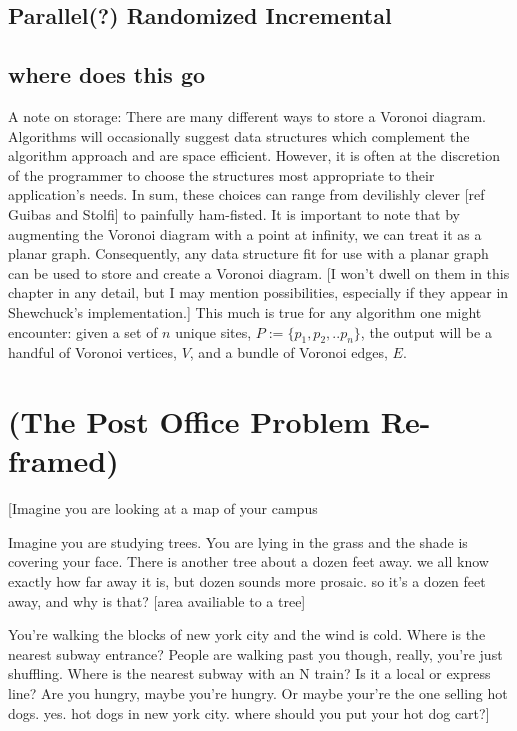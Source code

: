 \documentclass[12pt,twoside]{reedthesis}
\begin{document}
  \section{Parallel(?) Randomized Incremental} %
  \label{sec:parallel_randomized_incremental}

  \section{where does this go}
    A note on storage: There are many different ways to store a Voronoi diagram. Algorithms will occasionally suggest data structures which complement the algorithm approach and are space efficient. However, it is often at the discretion of the programmer to choose the structures most appropriate to their application's needs. In sum, these choices can range from devilishly clever [ref Guibas and Stolfi] to painfully ham-fisted. It is important to note that by augmenting the Voronoi diagram with a point at infinity, we can treat it as a planar graph. Consequently, any data structure fit for use with a planar graph can be used to store and create a Voronoi diagram. [I won't dwell on them in this chapter in any detail, but I may mention possibilities, especially if they appear in Shewchuck's implementation.] This much is true for any algorithm one might encounter: given a set of $n$ unique sites, $P:=\{p_{1}, p_{2}, .. p_{n}\}$, the output will be a handful of Voronoi vertices, $V$, and a bundle of Voronoi edges, $E$. 


\appendix
  \chapter{(The Post Office Problem Re-framed)}
  \label{appendix_one}
  [Imagine you are looking at a map of your campus\par
  Imagine you are studying trees. You are lying in the grass and the shade is covering your face. There is another tree about a dozen feet away. we all know exactly how far away it is, but dozen sounds more prosaic. so it's a dozen feet away, and why is that? [area availiable to a tree]\par
  You're walking the blocks of new york city and the wind is cold. Where is the nearest subway entrance? People are walking past you though, really, you're just shuffling. Where is the nearest subway with an N train? Is it a local or express line? Are you hungry, maybe you're hungry. Or maybe your're the one selling hot dogs. yes. hot dogs in new york city. where should you put your hot dog cart?] 
\backmatter
% 

\end{document}
